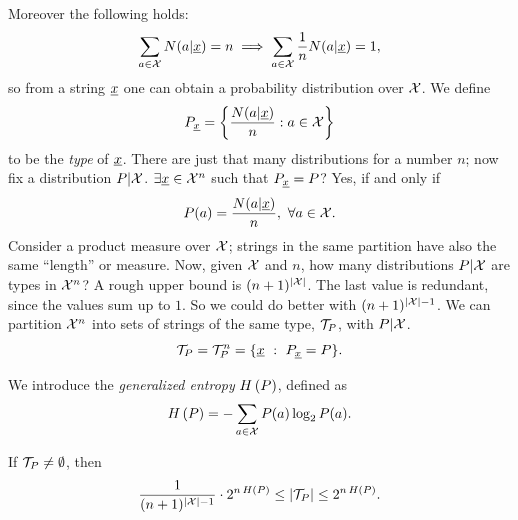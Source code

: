 Moreover the following holds:
\begin{equation*}
	\sum_{a \in \mathcal{X}} N(a|\underline{x}) = n
	\implies \sum_{a\in \mathcal{X}} \frac{1}{n} N(a|\underline{x}) = 1,
\end{equation*}
so from a string $\underline{x}$ one can obtain a probability distribution over $\mathcal{X}$.
We define
\begin{equation*}
	P_{\underline{x}} = \left\{ \frac{N(a|\underline{x})}{n} : a \in \mathcal{X} \right\}
\end{equation*}
to be the \emph{type} of $\underline{x}$.
There are just that many distributions for a number $n$; now fix a distribution $P|\mathcal{X}$.
$\exists \underline{x} \in \mathcal{X}^n$ such that  $P_{\underline{x}} = P$?
Yes, if and only if
\begin{equation*}
	P(a) = \dfrac{N(a | \underline{x})}{n},\ \forall a \in \mathcal{X}.
\end{equation*}
Consider a product measure over $\mathcal{X}$; strings in the same partition have also the same ``length'' or measure.
Now, given $\mathcal{X}$ and $n$, how many distributions $P|\mathcal{X}$ are types in $\mathcal{X}^n$?
A rough upper bound is $(n + 1)^{\left|{\mathcal{X}}\right|}$.
The last value is redundant, since the values sum up to $1$.
So we could do better with $(n + 1)^{\left|{\mathcal{X}}\right| - 1}$.
We can partition $\mathcal{X}^n$ into sets of strings of the same type, $\T_P$, with $P|\mathcal{X}$.
\begin{equation*}
	\mathcal{T}_P = \mathcal{T}_P^n = \{\underline{x}\ :\ P_{\underline{x}} = P\}.
\end{equation*}

\begin{definition}
	We introduce the \emph{generalized entropy} $H\left({P}\right)$, defined as
	\begin{equation*}
		H\left({P}\right) = -\sum_{a \in \mathcal{X}} P(a) \log_2 P(a).
	\end{equation*}
\end{definition}

\begin{thm}[Cardinality of $\T_P$] \label{thms:taupcard}
	If $\mathcal{T}_P \ne \emptyset$, then
	\begin{equation*}
		\frac{1}{(n+1)^{\left|{\mathcal{X}}\right| -1}} \cdot 2^{n \, H\left({P}\right)}
		\leq
		\left|{\mathcal{T}_P}\right|
		\le 2^{n \, H\left({P}\right)}.
	\end{equation*}
\end{thm}


